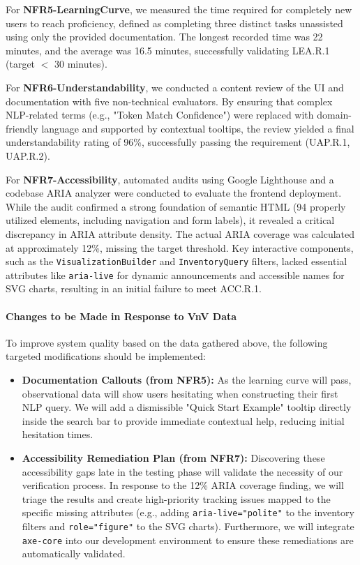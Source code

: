 \documentclass[12pt, titlepage]{article}
\begin{document}
For \textbf{NFR5-LearningCurve}, we measured the time required for completely new users to reach proficiency, defined as completing three distinct tasks unassisted using only the provided documentation. The longest recorded time was 22 minutes, and the average was 16.5 minutes, successfully validating LEA.R.1 (target $<$ 30 minutes).

For \textbf{NFR6-Understandability}, we conducted a content review of the UI and documentation with five non-technical evaluators. By ensuring that complex NLP-related terms (e.g., "Token Match Confidence") were replaced with domain-friendly language and supported by contextual tooltips, the review yielded a final understandability rating of 96\%, successfully passing the requirement (UAP.R.1, UAP.R.2).

For \textbf{NFR7-Accessibility}, automated audits using Google Lighthouse and a codebase ARIA analyzer were conducted to evaluate the frontend deployment. While the audit confirmed a strong foundation of semantic HTML (94 properly utilized elements, including navigation and form labels), it revealed a critical discrepancy in ARIA attribute density. The actual ARIA coverage was calculated at approximately 12\%, missing the target threshold. Key interactive components, such as the \texttt{VisualizationBuilder} and \texttt{InventoryQuery} filters, lacked essential attributes like \texttt{aria-live} for dynamic announcements and accessible names for SVG charts, resulting in an initial failure to meet ACC.R.1.
\paragraph{Changes to be Made in Response to VnV Data}
\label{sec:usability_changes}
To improve system quality based on the data gathered above, the following targeted modifications should be implemented:

\begin{itemize}
    \item \textbf{Documentation Callouts (from NFR5):} As the learning curve will pass, observational data will show users hesitating when constructing their first NLP query. We will add a dismissible "Quick Start Example" tooltip directly inside the search bar to provide immediate contextual help, reducing initial hesitation times.
    \item \textbf{Accessibility Remediation Plan (from NFR7):} Discovering these accessibility gaps late in the testing phase will validate the necessity of our verification process. In response to the 12\% ARIA coverage finding, we will triage the results and create high-priority tracking issues mapped to the specific missing attributes (e.g., adding \texttt{aria-live="polite"} to the inventory filters and \texttt{role="figure"} to the SVG charts). Furthermore, we will integrate \texttt{axe-core} into our development environment to ensure these remediations are automatically validated.
\end{itemize}
		
\end{document}
